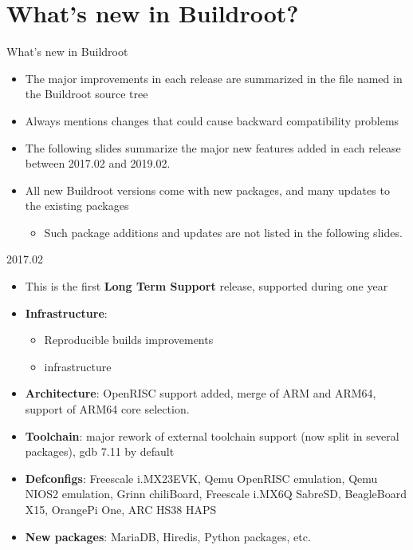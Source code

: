 \section{What's new in Buildroot?}

\begin{frame}{What's new in Buildroot}
  \begin{itemize}
  \item The major improvements in each release are summarized in the
    file named  in the Buildroot source tree
  \item Always mentions changes that could cause backward
    compatibility problems
  \item The following slides summarize the major new features added in
    each release between 2017.02 and 2019.02.
  \item All new Buildroot versions come with new packages, and many
    updates to the existing packages
    \begin{itemize}
    \item Such package additions and updates are not listed in the
      following slides.
    \end{itemize}
  \end{itemize}
\end{frame}

\begin{frame}{2017.02}
  \begin{itemize}
  \item This is the first {\bf Long Term Support} release, supported
    during one year
  \item {\bf Infrastructure}:
    \begin{itemize}
    \item Reproducible builds improvements
    \item {} infrastructure
    \end{itemize}
  \item {\bf Architecture}: OpenRISC support added, merge of ARM and
    ARM64, support of ARM64 core selection.
  \item {\bf Toolchain}: major rework of external toolchain support
    (now split in several packages), gdb 7.11 by default
  \item {\bf Defconfigs}: Freescale i.MX23EVK, Qemu OpenRISC
    emulation, Qemu NIOS2 emulation, Grinn chiliBoard, Freescale
    i.MX6Q SabreSD, BeagleBoard X15, OrangePi One, ARC HS38 HAPS
  \item {\bf New packages}: MariaDB, Hiredis, Python packages, etc.
  \end{itemize}
\end{frame}

